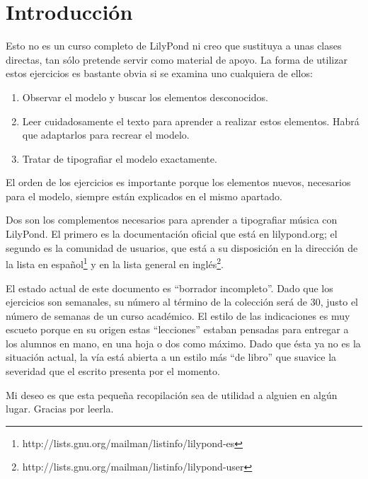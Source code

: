 \section*{Introducción}

Esto no es un curso completo de LilyPond ni creo que sustituya a unas
clases directas, tan sólo pretende servir como material de apoyo. La
forma de utilizar estos ejercicios es bastante obvia si se examina uno
cualquiera de ellos:

\begin{enumerate}
\item Observar el modelo y buscar los elementos desconocidos.

\item Leer cuidadosamente el texto para aprender a realizar estos elementos.
Habrá que adaptarlos para recrear el modelo.

\item Tratar de tipografiar el modelo exactamente.

\end{enumerate}

El orden de los ejercicios es importante porque los elementos nuevos,
necesarios para el modelo, siempre están explicados en el mismo
apartado.

Dos son los complementos necesarios para aprender a tipografiar música
con LilyPond.  El primero es la documentación oficial que está en
lilypond.org; el segundo es la comunidad de usuarios, que está a su
disposición en la dirección de la lista en
español\footnote{http://lists.gnu.org/mailman/listinfo/lilypond-es} y
en la lista general en
inglés\footnote{http://lists.gnu.org/mailman/listinfo/lilypond-user}.

El estado actual de este documento es ``borrador incompleto''.  Dado
que los ejercicios son semanales, su número al término de la colección
será de 30, justo el número de semanas de un curso académico.  El
estilo de las indicaciones es muy escueto porque en su origen estas
``lecciones'' estaban pensadas para entregar a los alumnos en mano, en
una hoja o dos como máximo.  Dado que ésta ya no es la situación
actual, la vía está abierta a un estilo más ``de libro'' que suavice
la severidad que el escrito presenta por el momento.


Mi deseo es que esta pequeña recopilación sea de utilidad a alguien en
algún lugar.  Gracias por leerla.



